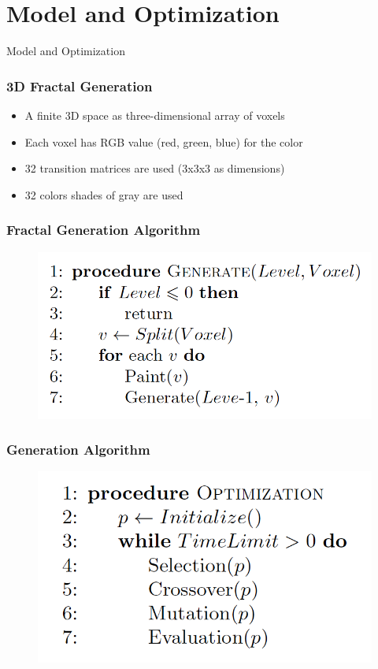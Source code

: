 \documentclass{beamer}
\begin{document}
\section{Model and Optimization}

\begin{frame}
\center \huge{Model and Optimization}
\end{frame}

\begin{frame}
\frametitle{3D Fractal Generation}
\begin{itemize}
  \item A finite 3D space as three-dimensional array of voxels
  \item Each voxel has RGB value (red, green, blue) for the color
  \item 32 transition matrices are used (3x3x3 as dimensions)
  \item 32 colors shades of gray are used
\end{itemize}
\end{frame}

\begin{frame}
\frametitle{Fractal Generation Algorithm}
\begin{figure}[h]
  \centering
  \includegraphics[width=0.95\linewidth]{pic04}
\label{figure02}
\end{figure}
\end{frame}

\begin{frame}
\frametitle{Generation Algorithm}
\begin{figure}[h]
  \centering
  \includegraphics[width=0.95\linewidth]{pic05}
\label{figure03}
\end{figure}
\end{frame}
\end{document}
